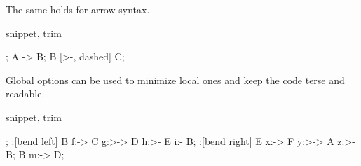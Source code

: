 The same holds for arrow syntax.

\begin{tcblisting}{snippet, trim}
\begin{codi}
;
\mor A -> B;
\mor B [>-, dashed] C;
\end{codi}
\end{tcblisting}

Global options can be used to minimize local ones
and keep the code terse and readable.

\begin{tcblisting}{snippet, trim}
\begin{codi}
;
\mor [swap]:[bend left] B f:-> C g:>-> D h:>- E i:- B;
\mor :[bend right] E x:-> F y:>-> A z:>- B;
\mor [mid] B m:-> D;
\end{codi}
\end{tcblisting}

\endgroup
